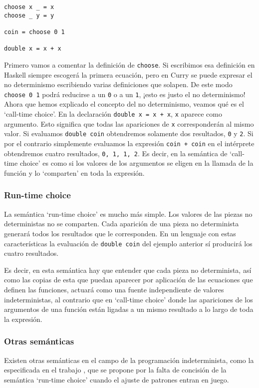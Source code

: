 \documentclass[class=article, crop=false]{standalone}
\begin{document}
\begin{verbatim}
choose x _ = x
choose _ y = y

coin = choose 0 1

double x = x + x
\end{verbatim}

Primero vamos a comentar la definición de \verb`choose`. Si escribimos esa definición en
Haskell siempre escogerá la primera ecuación, pero en Curry se puede expresar el no
determinismo escribiendo varias definiciones que solapen. De este modo \verb`choose 0 1`
podrá reducirse a un \verb`0` o a un \verb`1`, ¡esto es justo el no determinismo! Ahora que
hemos explicado el concepto del no determinismo, veamos qué es el `call-time choice'. En la
declaración \verb`double x = x + x`, \verb`x` aparece como argumento. Esto significa que
todas las apariciones de \verb`x` corresponderán al mismo valor. Si evaluamos
\verb`double coin` obtendremos solamente dos resultados, \verb`0` y \verb`2`. Si por el
contrario simplemente evaluamos la expresión \verb`coin + coin` en el intérprete obtendremos
cuatro resultados, \verb`0, 1, 1, 2`. Es decir, en la semántica de `call-time choice' es como
si los valores de los argumentos se eligen en la llamada de la función y lo `comparten' en
toda la expresión.

\subsubsection{Run-time choice}
La semántica `run-time choice' es mucho más simple. Los valores de las piezas no
deterministas no se comparten. Cada aparición de una pieza no determinista generará todos los
resultados que le corresponden. En un lenguaje con estas características la evaluación de
\verb`double coin` del ejemplo anterior sí producirá los cuatro resultados.

Es decir, en esta semántica hay que entender que cada pieza no determinista, así como las
copias de esta que puedan aparecer por aplicación de las ecuaciones que definen las
funciones, actuará como una fuente independiente de valores indeterministas, al contrario que
en `call-time choice' donde las apariciones de los argumentos de una función están ligadas a
un mismo resultado a lo largo de toda la expresión.

\subsubsection{Otras semánticas}
Existen otras semánticas en el campo de la programación indeterminista, como la especificada
en el trabajo \cite{riesco2014singular}, que se propone por la falta de concisión de la
semántica `run-time choice' cuando el ajuste de patrones entran en juego.
\end{document}

